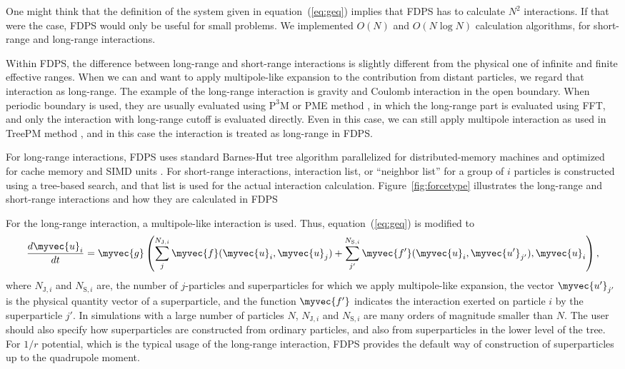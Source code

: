 One might think that the definition of the system given in
equation~(\ref{eq:geq})  implies that  FDPS has to calculate $N^2$
interactions. If that were the case, FDPS would only be useful for
small problems. We implemented $O(N)$ and $O(N\log N)$ calculation
algorithms, for short-range and long-range interactions.

Within FDPS, the difference between long-range and short-range
interactions is slightly different from the physical one of infinite
and finite effective ranges. When we can and want to apply
multipole-like expansion to the contribution from distant particles,
we regard that interaction as long-range. The example of the
long-range interaction is gravity and Coulomb interaction in the open
boundary. When periodic boundary is used, they are usually evaluated
using $\mathrm{P^3M}$ or PME method \cite{hockney1988computer}, in
which the long-range part is evaluated using FFT, and only the
interaction with long-range cutoff is evaluated directly.  Even in
this case, we can still apply multipole interaction as used in TreePM
method \cite{1995ApJS...98..355X, 2000ApJS..128..561B,
  2002JApA...23..185B, 2004NewA....9..111D, springel:gadget2,
  2005PASJ...57..849Y, ishiyama:greem, ishiyama:gordonbell}, and in
this case the interaction is treated as long-range in FDPS.

For long-range interactions, FDPS uses standard Barnes-Hut tree
algorithm \cite{1986Natur.324..446B, 1990JCoPh..87..161B} parallelized
for distributed-memory machines and optimized for cache memory and
SIMD units \cite{ishiyama:greem, ishiyama:gordonbell}. For short-range
interactions, interaction list, or ``neighbor list'' for a group of
$i$ particles is constructed using a tree-based search, and that list
is used for the actual interaction calculation.
Figure~\ref{fig:forcetype} illustrates the long-range and short-range
interactions and how they are calculated in FDPS

For the long-range interaction, a multipole-like interaction is
used. Thus, equation~(\ref{eq:geq}) is modified to 
\begin{align}
  \frac{d\myvec{u}_i}{dt} = \myvec{g}\left( \sum_j^{N_{\mathrm{J},i}}
  \myvec{f}(\myvec{u}_i,\myvec{u}_j) + \sum_{j'}^{N_{\mathrm{S},i}}
  \myvec{f'}(\myvec{u}_i,\myvec{u'}_{j'}), \myvec{u}_i
  \right), \label{eq:geqL}
\end{align}
where $N_{\mathrm{J},i}$ and $N_{\mathrm{S},i}$ are, the number of
$j$-particles and superparticles for which we apply multipole-like
expansion, the vector $\myvec{u'}_{j'}$ is the physical quantity
vector of a superparticle, and the function $\myvec{f'}$ indicates the
interaction exerted on particle $i$ by the superparticle $j'$. In
simulations with a large number of particles $N$, $N_{\mathrm{J},i}$
and $N_{\mathrm{S},i}$ are many orders of magnitude smaller than $N$.
The user should also specify how superparticles are constructed from
ordinary particles, and also from superparticles in the lower level of
the tree. For $1/r$ potential, which is the typical usage of the
long-range interaction, FDPS provides the default way of construction
of superparticles up to the quadrupole moment.

